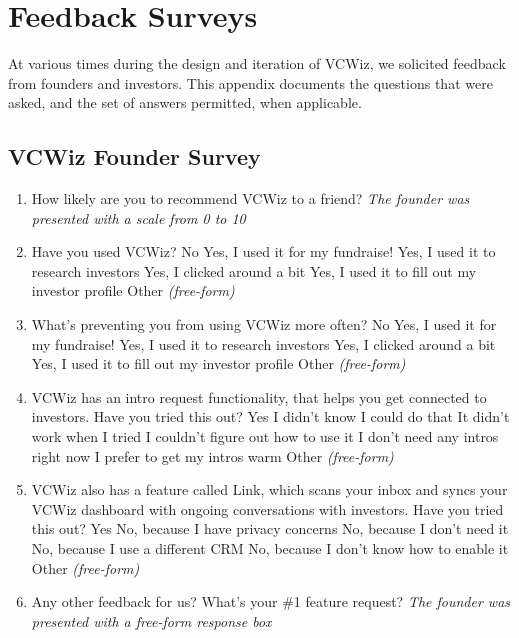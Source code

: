 \chapter{Feedback Surveys}
\label{appf:survey}

At various times during the design and iteration of VCWiz, we solicited feedback from founders and investors. This appendix documents the questions that were asked, and the set of answers permitted, when applicable.

\section{VCWiz Founder Survey}
\label{appf:survey:founders}

\begin{enumerate}
  \item How likely are you to recommend VCWiz to a friend?
    \subitem \textit{The founder was presented with a scale from 0 to 10}
  \item Have you used VCWiz?
    \subitem No
    \subitem Yes, I used it for my fundraise!
    \subitem Yes, I used it to research investors
    \subitem Yes, I clicked around a bit
    \subitem Yes, I used it to fill out my investor profile
    \subitem Other \textit{(free-form)}
  \item What's preventing you from using VCWiz more often?
    \subitem No
    \subitem Yes, I used it for my fundraise!
    \subitem Yes, I used it to research investors
    \subitem Yes, I clicked around a bit
    \subitem Yes, I used it to fill out my investor profile
    \subitem Other \textit{(free-form)}
  \item VCWiz has an intro request functionality, that helps you get connected to investors. Have you tried this out?
    \subitem Yes
    \subitem I didn't know I could do that
    \subitem It didn't work when I tried
    \subitem I couldn't figure out how to use it
    \subitem I don't need any intros right now
    \subitem I prefer to get my intros warm
    \subitem Other \textit{(free-form)}
  \item VCWiz also has a feature called Link, which scans your inbox and syncs your VCWiz dashboard with ongoing conversations with investors. Have you tried this out?
    \subitem Yes
    \subitem No, because I have privacy concerns
    \subitem No, because I don't need it
    \subitem No, because I use a different CRM
    \subitem No, because I don't know how to enable it
    \subitem Other \textit{(free-form)}
  \item Any other feedback for us? What's your \#1 feature request?
    \subitem \textit{The founder was presented with a free-form response box}
\end{enumerate}


